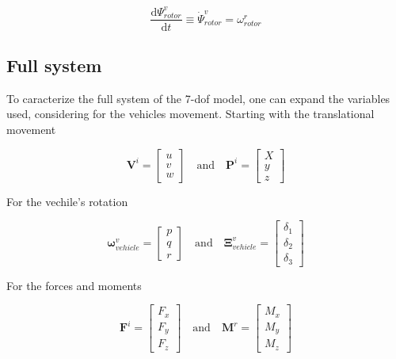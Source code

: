 \begin{equation}
    \frac{\mathrm{d}\Psi^v_{rotor}}{\mathrm{d}t} \equiv \dot{\Psi}^v_{rotor} = \omega^r_{rotor} 
\end{equation}

\subsection{Full system}

To caracterize the full system of the 7-\gls{dof} model, one can expand the variables used, considering for the vehicles movement. Starting with the translational movement

\begin{equation}
    \mathbf{V}^i = \begin{bmatrix} u \\ v \\ w \end{bmatrix}
    \quad \text{and} \quad 
    \mathbf{P}^i = \begin{bmatrix} X \\ y \\ z \end{bmatrix}
\end{equation}

For the vechile's rotation

\begin{equation}
    \boldsymbol{\omega}^v_{vehicle} = \begin{bmatrix} p \\ q \\ r \end {bmatrix}
    \quad \text{and} \quad
    \mathbf{\Xi}^v_{vehicle} = \begin{bmatrix} \delta_1 \\ \delta_2 \\ \delta_3 \end {bmatrix}
\end{equation}

For the forces and moments

\begin{equation}
    \mathbf{F}^i = \begin{bmatrix} F_x \\ F_y \\ F_z \end {bmatrix}
    \quad \text{and} \quad
    \mathbf{M}^r = \begin{bmatrix} M_x \\ M_y \\ M_z \end {bmatrix}
\end{equation}


